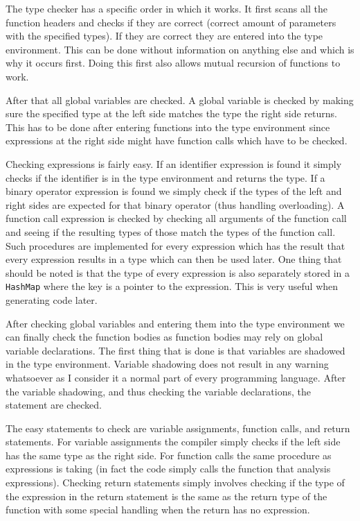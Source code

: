 \documentclass{article}
\begin{document}
The type checker has a specific order in which it works. It first scans all the function headers and checks if they are correct (correct amount of parameters with the specified types). If they are correct they are entered into the type environment. This can be done without information on anything else and which is why it occurs first. Doing this first also allows mutual recursion of functions to work.

After that all global variables are checked. A global variable is checked by making sure the specified type at the left side matches the type the right side returns. This has to be done after entering functions into the type environment since expressions at the right side might have function calls which have to be checked.

Checking expressions is fairly easy. If an identifier expression is found it simply checks if the identifier is in the type environment and returns the type. If a binary operator expression is found we simply check if the types of the left and right sides are expected for that binary operator (thus handling overloading). A function call expression is checked by checking all arguments of the function call and seeing if the resulting types of those match the types of the function call. Such procedures are implemented for every expression which has the result that every expression results in a type which can then be used later. One thing that should be noted is that the type of every expression is also separately stored in a \texttt{HashMap} where the key is a pointer to the expression. This is very useful when generating code later.

After checking global variables and entering them into the type environment we can finally check the function bodies as function bodies may rely on global variable declarations. The first thing that is done is that variables are shadowed in the type environment. Variable shadowing does not result in any warning whatsoever as I consider it a normal part of every programming language. After the variable shadowing, and thus checking the variable declarations, the statement are checked.

The easy statements to check are variable assignments, function calls, and return statements. For variable assignments the compiler simply checks if the left side has the same type as the right side. For function calls the same procedure as expressions is taking (in fact the code simply calls the function that analysis expressions). Checking return statements simply involves checking if the type of the expression in the return statement is the same as the return type of the function with some special handling when the return has no expression.
\end{document}
